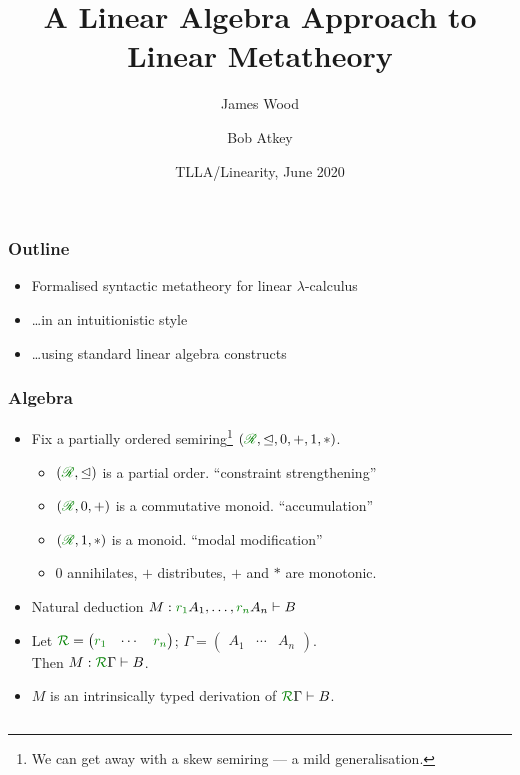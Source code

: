 \documentclass[fleqn]{beamer}
\title{A Linear Algebra Approach to Linear Metatheory}
\author{James Wood\inst{1} \and Bob Atkey\inst{1}}
\institute{\inst{1}University of Strathclyde}
\date{TLLA/Linearity, June 2020}
\begin{document}
\frame{\titlepage}
\begin{frame}
  \frametitle{Outline}
  \begin{itemize}
    \item Formalised syntactic metatheory for linear $\lambda$-calculus
    \item \ldots in an intuitionistic style
    \item \ldots using standard linear algebra constructs
  \end{itemize}
\end{frame}
\begin{frame}
  \frametitle{Algebra}
  \begin{itemize}
    \item Fix a partially ordered semiring\footnote{We can get away with a skew
      semiring --- a mild generalisation.}
      $(\rescomment{\mathscr R}, \subres, 0, +, 1, *)$.
      \begin{itemize}
        \item $(\rescomment{\mathscr R}, \subres)$ is a partial order.
          ``constraint strengthening''
        \item $(\rescomment{\mathscr R}, 0, +)$ is a commutative monoid.
          ``accumulation''
        \item $(\rescomment{\mathscr R}, 1, *)$ is a monoid. ``modal
          modification''
        \item $0$ annihilates, $+$ distributes, $+$ and $*$ are monotonic.
      \end{itemize}
    \item Natural deduction
      $M : \ctxvar{x_1}{A_1}{r_1}, \ldots, \ctxvar{x_n}{A_n}{r_n} \vdash B$
    \item Let
      $\resctx R = \begin{pmatrix}
        \rescomment{r_1} & \cdots & \rescomment{r_n}
      \end{pmatrix}$;
      $\Gamma = \begin{pmatrix}A_1 & \cdots & A_n\end{pmatrix}$. \\
      Then $M : \ctx{\Gamma}{R} \vdash B$.
    \item $M$ is an intrinsically typed derivation of
      $\ctx{\Gamma}{R} \vdash B$.
  \end{itemize}
  \begin{columns}
    \begin{column}{0.5\textwidth}
      \centering
      \begin{tikzpicture}[scale=0.5,baseline={(0,1)}]

\end{tikzpicture}
\end{column}
\end{columns}
\end{frame}
\end{document}
